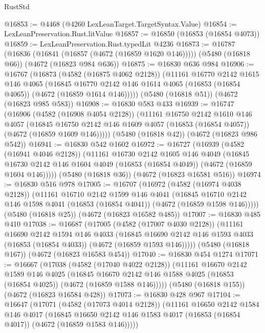 \begin{lexlean}{RustStd}
\begin{coremodule}
{\begin{coremodule}
{{{{{{{{{{{{{{{{@16853 := @4468 (@4260 LexLeanTarget.TargetSyntax.Value)
@16854 := LexLeanPreservation.Rust.litValue
@16857 := @16850 (@16853 (@16854 @4073))
@16859 := LexLeanPreservation.Rust.typedLit @4236
@16873 := @16787
    (@16836 (@16841 (@16857 (@4672 (@16859 @1620 @146)))))
    (@5480 (@16818 @66))
    (@4672 (@16823 @984 @636))
@16875 := @16830 @636 @984
@16906 := @16767
    (@16873
      (@4582 (@16875 @4062 @2128))
      (@11161
        @16770
        @2142
        @1615
        @146
        @4065
        (@16845 @16770 @2142 @146 @1614 @4065 (@16853 (@16854 @4065)) (@4672 (@16859 @1614 @146)))))
    (@5480 (@16818 @51))
    (@4672 (@16823 @985 @583))
@16908 := @16830 @583 @433
@16939 := @16747
    (@16906
      (@4582 (@16908 @4054 @2128))
      (@11161
        @16750
        @2142
        @1610
        @146
        @4057
        (@16845 @16750 @2142 @146 @1609 @4057 (@16853 (@16854 @4057)) (@4672 (@16859 @1609 @146)))))
    (@5480 (@16818 @42))
    (@4672 (@16823 @986 @542))
@16941 := @16830 @542 @1602
@16972 := @16727
    (@16939
      (@4582 (@16941 @4046 @2128))
      (@11161
        @16730
        @2142
        @1605
        @146
        @4049
        (@16845 @16730 @2142 @146 @1604 @4049 (@16853 (@16854 @4049)) (@4672 (@16859 @1604 @146)))))
    (@5480 (@16818 @36))
    (@4672 (@16823 @16581 @516))
@16974 := @16830 @516 @978
@17005 := @16707
    (@16972
      (@4582 (@16974 @4038 @2128))
      (@11161
        @16710
        @2142
        @1599
        @146
        @4041
        (@16845 @16710 @2142 @146 @1598 @4041 (@16853 (@16854 @4041)) (@4672 (@16859 @1598 @146)))))
    (@5480 (@16818 @25))
    (@4672 (@16823 @16582 @485))
@17007 := @16830 @485 @410
@17038 := @16687
    (@17005
      (@4582 (@17007 @4030 @2128))
      (@11161
        @16690
        @2142
        @1594
        @146
        @4033
        (@16845 @16690 @2142 @146 @1593 @4033 (@16853 (@16854 @4033)) (@4672 (@16859 @1593 @146)))))
    (@5480 (@16818 @167))
    (@4672 (@16823 @16583 @454))
@17040 := @16830 @454 @1274
@17071 := @16667
    (@17038
      (@4582 (@17040 @4022 @2128))
      (@11161
        @16670
        @2142
        @1589
        @146
        @4025
        (@16845 @16670 @2142 @146 @1588 @4025 (@16853 (@16854 @4025)) (@4672 (@16859 @1588 @146)))))
    (@5480 (@16818 @155))
    (@4672 (@16823 @16584 @428))
@17073 := @16830 @428 @967
@17104 := @16647
    (@17071
      (@4582 (@17073 @4014 @2128))
      (@11161
        @16650
        @2142
        @1584
        @146
        @4017
        (@16845 @16650 @2142 @146 @1583 @4017 (@16853 (@16854 @4017)) (@4672 (@16859 @1583 @146)))))
}}}}}}}}}}}}}}}}
\end{coremodule}}
\end{coremodule}
\end{lexlean}
